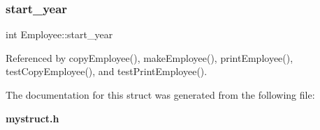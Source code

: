 \subsubsection{start\+\_\+year}
{\footnotesize\ttfamily int Employee\+::start\+\_\+year}



Referenced by copy\+Employee(), make\+Employee(), print\+Employee(), test\+Copy\+Employee(), and test\+Print\+Employee().



The documentation for this struct was generated from the following file\+:\begin{DoxyCompactItemize}
\item 
\textbf{ mystruct.\+h}\end{DoxyCompactItemize}
